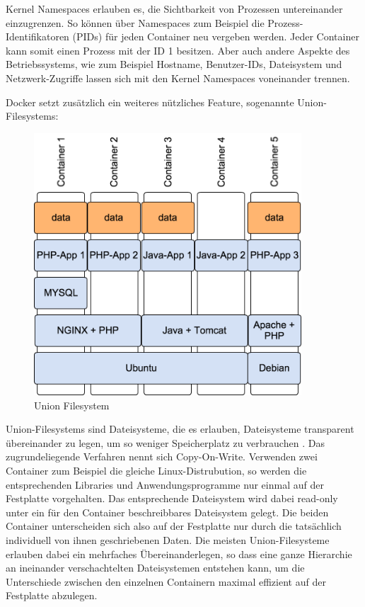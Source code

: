 Kernel Namespaces \citep[Vgl.][S. 3]{Schee14} erlauben es, die Sichtbarkeit von Prozessen untereinander einzugrenzen. So können über Namespaces zum Beispiel die Prozess-Identifikatoren (PIDs) für jeden Container neu vergeben werden. Jeder Container kann somit einen Prozess mit der ID 1 besitzen. Aber auch andere Aspekte des Betriebssystems, wie zum Beispiel Hostname, Benutzer-IDs, Dateisystem und Netzwerk-Zugriffe lassen sich mit den Kernel Namespaces voneinander trennen.

Docker setzt zusätzlich ein weiteres nützliches Feature, sogenannte Union-Filesystems:

\begin{figure}[!ht]
  \begin{center}
    \includegraphics[width=10cm]{bilder/UnionFilesystem.png}
    \caption{Union Filesystem}
    \label{Union Filesystem}
  \end{center}
\end{figure}

Union-Filesystems sind Dateisysteme, die es erlauben, Dateisysteme transparent übereinander zu legen, um so weniger Speicherplatz zu verbrauchen \citep[Vgl.][S. 3]{Schee14}. Das zugrundeliegende Verfahren nennt sich Copy-On-Write. Verwenden zwei Container zum Beispiel die gleiche Linux-Distrubution, so werden die entsprechenden Libraries und Anwendungsprogramme nur einmal auf der Festplatte vorgehalten. Das entsprechende Dateisystem wird dabei read-only unter ein für den Container beschreibbares Dateisystem gelegt. Die beiden Container unterscheiden sich also auf der Festplatte nur durch die tatsächlich individuell von ihnen geschriebenen Daten. Die meisten Union-Filesysteme erlauben dabei ein mehrfaches Übereinanderlegen, so dass eine ganze Hierarchie an ineinander verschachtelten Dateisystemen entstehen kann, um die Unterschiede zwischen den einzelnen Containern maximal effizient auf der Festplatte abzulegen.

